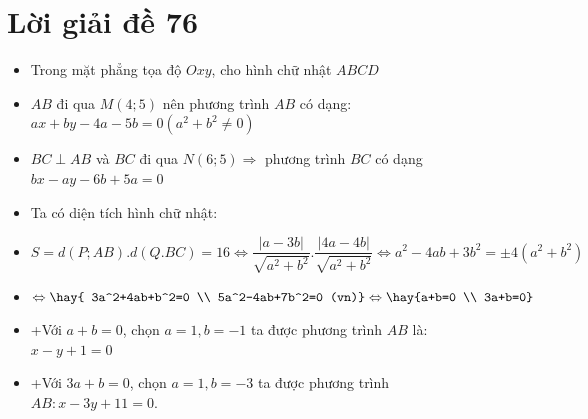 \section{Lời giải đề 76}
\lgi 
\begin{itemize}[label=,leftmargin=*]
\item Trong mặt phẳng tọa độ $Oxy$, cho hình chữ nhật $ABCD$
\item $AB$ đi qua $M(4;5)$ nên phương trình $AB$ có dạng: $ax+by-4a-5b=0 (a^2+b^2 \neq 0)$
\item $BC \perp AB$ và $BC$ đi qua $N(6;5) \Rightarrow $ phương trình $BC$ có dạng $bx-ay-6b+5a=0$
\item Ta có diện tích hình chữ nhật:
\item $S=d(P;AB).d(Q.BC)=16 \Leftrightarrow \dfrac{|a-3b|}{\sqrt{a^2+b^2}}.\dfrac{|4a-4b|}{\sqrt{a^2+b^2}} \Leftrightarrow a^2-4ab+3b^2=\pm 4(a^2+b^2)$
\item $ \Leftrightarrow	\hay{ 3a^2+4ab+b^2=0 \\
5a^2-4ab+7b^2=0 (vn)}
\Leftrightarrow \hay {a+b=0 \\ 3a+b=0}$
\item +Với $a+b=0$, chọn $ a=1,b=-1$ ta được phương trình $AB$ là: $x-y+1=0$
\item +Với $3a+b=0$, chọn $a=1,b=-3$ ta được phương trình $AB: x-3y+11=0$.
\end{itemize}
\lgi 
